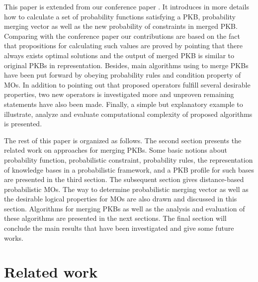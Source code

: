 \documentclass[]{iosart2c}
\begin{document}
  This paper is extended from our conference paper \cite{24}. It introduces in more details how to calculate a set of
  probability functions satisfying a PKB, probability merging vector as well as the new probability of constraints in
  merged PKB. Comparing with the conference paper our contributions are based on the fact that propositions for
  calculating such values are proved by pointing that there always exists optimal solutions \cite{25} and the output of
  merged PKB is similar to original PKBs in representation. Besides, main algorithms using to merge PKBs have been put
  forward by obeying probability rules and condition property of MOs. In addition to pointing out that proposed
  operators fulfill several desirable properties, two new operators is investigated more and unproven remaining
  statements have also been made. Finally, a simple but explanatory example to illustrate, analyze and evaluate
  computational complexity of proposed algorithms is presented.
  
  The rest of this paper is organized as follows. The second section presents the related work on approaches for
  merging PKBs. Some basic notions about probability function, probabilistic constraint, probability rules, the
  representation of knowledge bases in a probabilistic framework, and a PKB profile for such bases are presented in
  the third section. The subsequent section gives distance-based probabilistic MOs. The way to determine probabilistic
  merging vector as well as the desirable logical properties for MOs are also drawn and discussed in this section.
  Algorithms for merging PKBs as well as the analysis and evaluation of these algorithms are presented in the next
  sections. The final section will conclude the main results that have been investigated and give some future works.


  \section{Related work}
\end{document}

